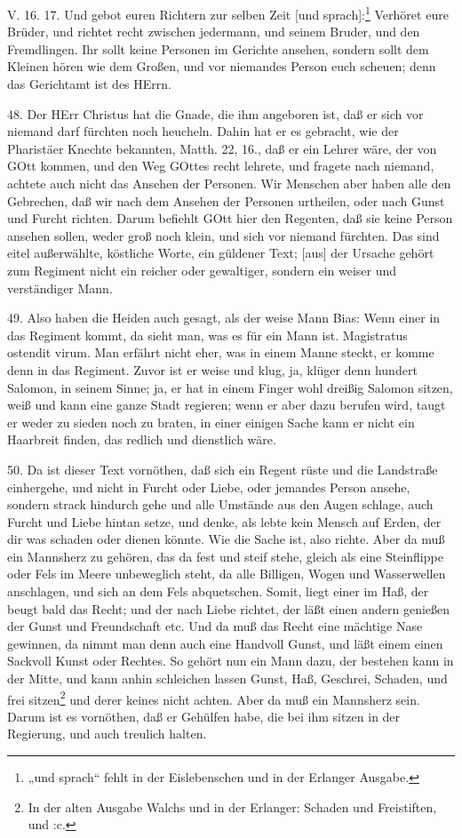 \begin{schriftzitat}
V. 16. 17. Und gebot euren Richtern zur selben Zeit [und sprach]:\footnote{„und sprach“ fehlt in der Eislebenschen und in der Erlanger Ausgabe.} Verhöret eure Brüder, und richtet recht zwischen jedermann, und seinem Bruder, und den Fremdlingen. Ihr sollt keine Personen im Gerichte ansehen, sondern sollt dem Kleinen hören wie dem Großen, und vor niemandes Person euch scheuen; denn das Gerichtamt ist des HErrn.
\end{schriftzitat}

48. Der HErr Christus hat die Gnade, die ihm angeboren ist, daß er sich vor niemand darf fürchten noch heucheln. Dahin hat er es gebracht, wie der Pharistäer Knechte bekannten, Matth. 22, 16., daß er ein Lehrer wäre, der von GOtt kommen, und den Weg GOttes recht lehrete, und fragete nach niemand, achtete auch nicht das Ansehen der Personen. Wir Menschen aber haben alle den Gebrechen, daß wir nach dem Ansehen der Personen urtheilen, oder nach Gunst und Furcht richten. Darum befiehlt GOtt hier den Regenten, daß sie keine Person ansehen sollen, weder groß noch klein, und sich vor niemand fürchten. Das sind eitel außerwählte, köstliche Worte, ein güldener Text; [aus] der Ursache gehört zum Regiment nicht ein reicher oder gewaltiger, sondern ein weiser und verständiger Mann.

49. Also haben die Heiden auch gesagt, als der weise Mann Bias: Wenn einer in das Regiment kommt, da sieht man, was es für ein Mann ist. Magistratus ostendit virum. Man erfährt nicht eher, was in einem Manne steckt, er komme denn in das Regiment. Zuvor ist er weise und klug, ja, klüger denn hundert Salomon, in seinem Sinne; ja, er hat in einem Finger wohl dreißig Salomon sitzen, weiß und kann eine ganze Stadt regieren; wenn er aber dazu berufen wird, taugt er weder zu sieden noch zu braten, in einer einigen Sache kann er nicht ein Haarbreit finden, das redlich und dienstlich wäre.

50. Da ist dieser Text vornöthen, daß sich ein Regent rüste und die Landstraße einhergehe, und nicht in Furcht oder Liebe, oder jemandes Person ansehe, sondern strack hindurch gehe und alle Umstände aus den Augen schlage, auch Furcht und Liebe hintan setze, und denke, als lebte kein Mensch auf Erden, der dir was schaden oder dienen könnte. Wie die Sache ist, also richte. Aber da muß ein Mannsherz zu gehören, das da fest und steif stehe, gleich als eine Steinflippe oder Fels im Meere unbeweglich steht, da alle Billigen, Wogen und Wasserwellen anschlagen, und sich an dem Fels abquetschen. Somit, liegt einer im Haß, der beugt bald das Recht; und der nach Liebe richtet, der läßt einen andern genießen der Gunst und Freundschaft etc. Und da muß das Recht eine mächtige Nase gewinnen, da nimmt man denn auch eine Handvoll Gunst, und läßt einem einen Sackvoll Kunst oder Rechtes. So gehört nun ein Mann dazu, der bestehen kann in der Mitte, und kann anhin schleichen lassen Gunst, Haß, Geschrei, Schaden, und frei sitzen\footnote{In der alten Ausgabe Walchs und in der Erlanger: Schaden und Freistiften, und :c.} und derer keines nicht achten. Aber da muß ein Mannsherz sein. Darum ist es vornöthen, daß er Gehülfen habe, die bei ihm sitzen in der Regierung, und auch treulich halten.

